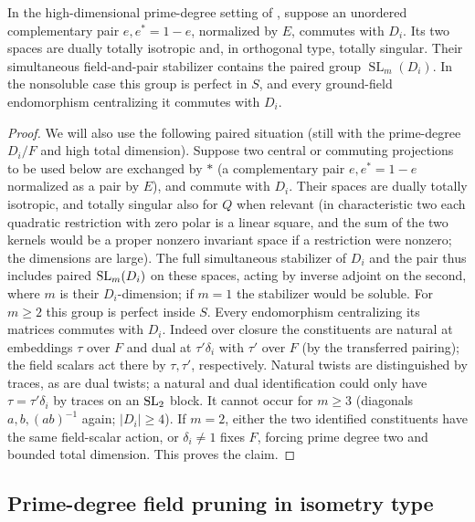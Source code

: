 \begin{lemma}\label{c:paired-transfer}
In the high-dimensional prime-degree setting of , suppose an unordered complementary pair \(e,e^*=1-e\), normalized by \(E\), commutes with \(D_i\). Its two spaces are dually totally isotropic and, in orthogonal type, totally singular. Their simultaneous field-and-pair stabilizer contains the paired group \(\operatorname{SL}_m(D_i)\). In the nonsoluble case this group is perfect in \(S\), and every ground-field endomorphism centralizing it commutes with \(D_i\).
\end{lemma}

\begin{proof}
We will also use the following paired situation (still with the prime-degree \(D_i/F\) and high total dimension). Suppose two central or commuting projections to be used below are exchanged by \(*\) (a complementary pair \(e,e^*=1-e\) normalized as a pair by \(E\)), and commute with \(D_i\). Their spaces are dually totally isotropic, and totally singular also for \(Q\) when relevant (in characteristic two each quadratic restriction with zero polar is a linear square, and the sum of the two kernels would be a proper nonzero invariant space if a restriction were nonzero; the dimensions are large). The full simultaneous stabilizer of \(D_i\) and the pair thus includes paired \({\rm SL}_m(D_i)\) on these spaces, acting by inverse adjoint on the second, where \(m\) is their \(D_i\)-dimension; if \(m=1\) the stabilizer would be soluble. For \(m\ge2\) this group is perfect inside \(S\). Every endomorphism centralizing its matrices commutes with \(D_i\). Indeed over closure the constituents are natural at embeddings \(\tau\) over \(F\) and dual at \(\tau'\delta_i\) with \(\tau'\) over \(F\) (by the transferred pairing); the field scalars act there by \(\tau,\tau'\), respectively. Natural twists are distinguished by traces, as are dual twists; a natural and dual identification could only have \(\tau=\tau'\delta_i\) by traces on an \({\rm SL}_2\) block. It cannot occur for \(m\ge3\) (diagonals \(a,b,(ab)^{-1}\) again; \(|D_i|\ge4\)). If \(m=2\), either the two identified constituents have the same field-scalar action, or \(\delta_i\ne1\) fixes \(F\), forcing prime degree two and bounded total dimension. This proves the claim.
\end{proof}

\subsection{Prime-degree field pruning in isometry type}

